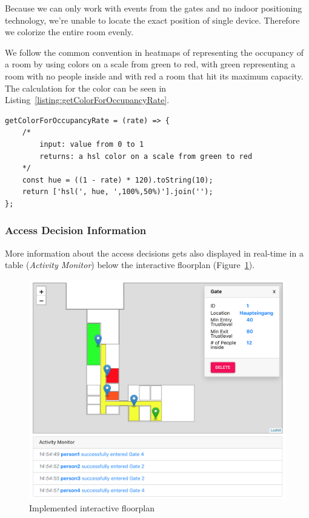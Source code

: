 Because we can only work with events from the gates and no indoor positioning technology, we're unable to locate the exact position of single device. Therefore we colorize the entire room evenly.

We follow the common convention in heatmaps of representing the occupancy of a room by using colors on a scale from green to red, with green representing a room with no people inside and with red a room that hit its maximum capacity. The calculation for the color can be seen in Listing~\ref{listing:getColorForOccupancyRate}.

\begin{lstlisting}[label={listing:getColorForOccupancyRate},caption={Function for calculating color based on occupancy}]
getColorForOccupancyRate = (rate) => {
    /*
        input: value from 0 to 1
        returns: a hsl color on a scale from green to red
    */
    const hue = ((1 - rate) * 120).toString(10);
    return ['hsl(', hue, ',100%,50%)'].join('');
};
\end{lstlisting}

\subsubsection{Access Decision Information}

More information about the access decisions gets also displayed in real-time in a table (\emph{Activity Monitor}) below the interactive floorplan (Figure~\ref{fig:FloorplanScreenshot}).

\begin{figure}[!hb]
    \centering
    \includegraphics[width=0.9\linewidth]{images/FloorplanScreenshot}
    \caption{Implemented interactive floorplan}
    \label{fig:FloorplanScreenshot}
\end{figure}

